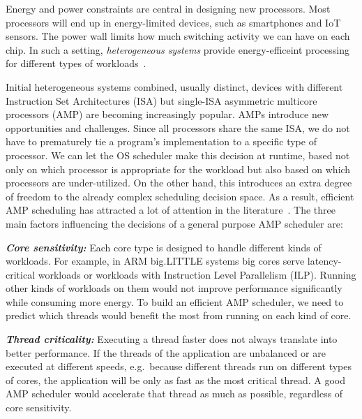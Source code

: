 Energy and power constraints are central in designing new processors. Most processors %
will end up in energy-limited devices, such as smartphones and IoT sensors. The power wall limits how much switching activity we can have on each chip. In such a setting, \emph{heterogeneous systems} provide energy-efficeint processing for different types of workloads~\cite{seeker2014measuring}.

Initial heterogeneous systems combined, usually distinct, devices with different Instruction Set Architectures (ISA) but single-ISA asymmetric multicore processors (AMP) are becoming increasingly popular. AMPs introduce new opportunities and challenges. Since all processors share the same ISA, we do not have to prematurely tie a program's implementation to a specific type of processor. We can let the OS scheduler make this decision at runtime, based not only on which processor is appropriate for the workload but also based on which processors are under-utilized. On the other hand, this introduces an extra degree of freedom to the already complex scheduling decision space. As a result, efficient AMP scheduling has attracted a lot of attention in the literature~\cite{mittal2016survey}. The three main factors influencing the decisions of a general purpose AMP scheduler are: 

\textbf{\textit{Core sensitivity:}} Each core type is designed to 
handle different kinds of workloads. For example, in ARM big.LITTLE systems big cores serve latency-critical workloads or workloads with Instruction Level Parallelism (ILP). Running other kinds of workloads on them would not improve performance significantly while consuming more energy. To build an efficient AMP scheduler, we need to predict which threads would benefit the most from running on each kind of core.

\textbf{\textit{Thread criticality:}} Executing a thread faster does not always translate into better performance. If the threads of the application are unbalanced or are executed at different speeds, 
e.g.~because different threads run on different types of cores,
the application will be only as fast as the most critical thread. A good AMP scheduler would accelerate that thread as much as possible, regardless of core sensitivity. 

